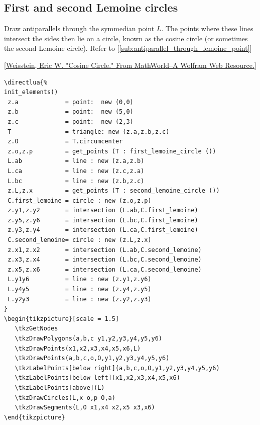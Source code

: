 
\subsection{First and second Lemoine circles} %
\label{sub:first_and_second_lemoine_circles}

Draw antiparallels through the symmedian point $L$. The points where these lines intersect the sides then lie on a circle, known as the cosine circle (or sometimes the second Lemoine circle). Refer to [\ref{sub:antiparallel_through_lemoine_point}]

[\href{https://mathworld.wolfram.com/CosineCircle.html}{Weisstein, Eric W. "Cosine Circle." From MathWorld--A Wolfram Web Resource.}]


\begin{Verbatim}
\directlua{%
init_elements()
 z.a             = point:  new (0,0)
 z.b             = point:  new (5,0)
 z.c             = point:  new (2,3)
 T               = triangle: new (z.a,z.b,z.c)
 z.O             = T.circumcenter
 z.o,z.p         = get_points (T : first_lemoine_circle ())
 L.ab            = line : new (z.a,z.b)
 L.ca            = line : new (z.c,z.a)
 L.bc            = line : new (z.b,z.c)
 z.L,z.x         = get_points (T : second_lemoine_circle ())
 C.first_lemoine = circle : new (z.o,z.p)
 z.y1,z.y2       = intersection (L.ab,C.first_lemoine)
 z.y5,z.y6       = intersection (L.bc,C.first_lemoine)
 z.y3,z.y4       = intersection (L.ca,C.first_lemoine)
 C.second_lemoine= circle : new (z.L,z.x)
 z.x1,z.x2       = intersection (L.ab,C.second_lemoine)
 z.x3,z.x4       = intersection (L.bc,C.second_lemoine)
 z.x5,z.x6       = intersection (L.ca,C.second_lemoine)
 L.y1y6          = line : new (z.y1,z.y6)
 L.y4y5          = line : new (z.y4,z.y5)
 L.y2y3          = line : new (z.y2,z.y3)
}
\begin{tikzpicture}[scale = 1.5]
   \tkzGetNodes
   \tkzDrawPolygons(a,b,c y1,y2,y3,y4,y5,y6)
   \tkzDrawPoints(x1,x2,x3,x4,x5,x6,L)
   \tkzDrawPoints(a,b,c,o,O,y1,y2,y3,y4,y5,y6)
   \tkzLabelPoints[below right](a,b,c,o,O,y1,y2,y3,y4,y5,y6)
   \tkzLabelPoints[below left](x1,x2,x3,x4,x5,x6)
   \tkzLabelPoints[above](L)
   \tkzDrawCircles(L,x o,p O,a)
   \tkzDrawSegments(L,O x1,x4 x2,x5 x3,x6)
\end{tikzpicture}
\end{Verbatim}

